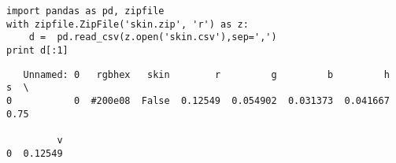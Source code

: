 \documentclass[12pt,fleqn]{article}\usepackage{../common}
\begin{document}
\begin{verbatim}
import pandas as pd, zipfile
with zipfile.ZipFile('skin.zip', 'r') as z:
    d =  pd.read_csv(z.open('skin.csv'),sep=',')
print d[:1]
\end{verbatim}

\begin{verbatim}
   Unnamed: 0   rgbhex   skin        r         g         b         h     s  \
0           0  #200e08  False  0.12549  0.054902  0.031373  0.041667  0.75   

         v  
0  0.12549  
\end{verbatim}
\end{document}

